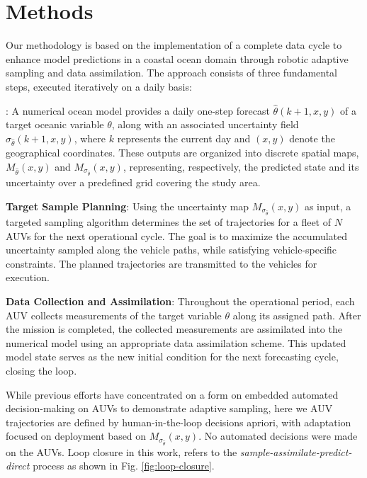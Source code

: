 \section{Methods}

Our methodology is based on the implementation of a complete data cycle
to enhance model predictions in a coastal ocean domain through robotic
adaptive sampling and data assimilation. The approach consists of three
fundamental steps, executed iteratively on a daily basis:

\begin{description}

\item[Model Forecast and Uncertainty Projection]: A numerical ocean
  model provides a daily one-step forecast $\hat{\theta}(k+1, x, y)$
  of a target oceanic variable $\theta$, along with an associated
  uncertainty field $\sigma_{\hat{\theta}}(k+1, x, y)$, where $k$
  represents the current day and $(x, y)$ denote the geographical
  coordinates.  These outputs are organized into discrete spatial
  maps, $M_{\hat{\theta}}(x, y)$ and
  $M_{\sigma_{\hat{\theta}}}(x, y)$, representing, respectively, the
  predicted state and its uncertainty over a predefined grid covering
  the study area.
    
\item \textbf{Target Sample Planning}: Using the uncertainty map
  $M_{\sigma_{\hat{\theta}}}(x, y)$ as input, a targeted sampling
  algorithm determines the set of trajectories for a fleet of $N$ AUVs
  for the next operational cycle. The goal is to maximize the
  accumulated uncertainty sampled along the vehicle paths, while
  satisfying vehicle-specific constraints. The planned trajectories
  are transmitted to the vehicles for execution.

\item \textbf{Data Collection and Assimilation}: Throughout the
  operational period, each AUV collects measurements of the target
  variable $\theta$ along its assigned path. After the mission is
  completed, the collected measurements are assimilated into the
  numerical model using an appropriate data assimilation scheme. This
  updated model state serves as the new initial condition for the next
  forecasting cycle, closing the loop.

\end{description}

While previous efforts have concentrated on a form on embedded
automated decision-making on AUVs
\cite{mcgann08a,mcgann08b,ryan10,py10,Das-2010-637,das10,olaya12,rajan12}
to demonstrate adaptive sampling, here we AUV trajectories are defined
by human-in-the-loop decisions apriori, with adaptation focused on
deployment based on $M_{\sigma_{\hat{\theta}}}(x, y)$. No automated
decisions were made on the AUVs. Loop closure in this work, refers to
the \emph{sample-assimilate-predict-direct} process as shown in
Fig. \ref{fig:loop-closure}.

